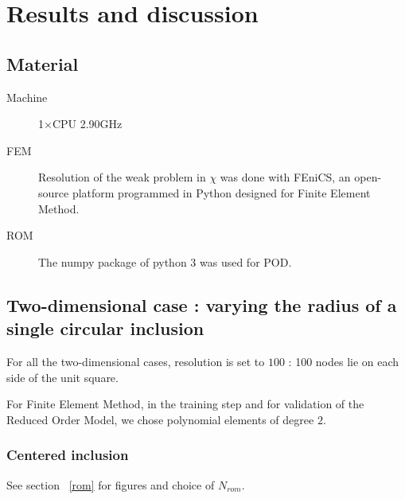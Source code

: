 \section{Results and discussion}\label{res}

\subsection{Material}

\begin{description}
\item [Machine] 1$\times$CPU 2.90GHz
\item [FEM] Resolution of the weak problem in $\chi$ was done with FEniCS, %
an open-source platform programmed in Python designed for Finite Element Method.
\item [ROM] The numpy package of python 3 was used for POD.
\end{description}

\subsection{Two-dimensional case : varying the radius of a single circular inclusion}

For all the two-dimensional cases, resolution is set to $100$ : %
100 nodes lie on each side of the unit square.

\par
For Finite Element Method, in the training step and for validation of the Reduced Order Model, we chose polynomial elements of degree $2$.

\subsubsection{Centered inclusion}

See section \ \ref{rom} for figures and choice of $N_{rom}$.
\begin{comment}
\begin{figure}[H]%
%
\begin{center}
\begin{tabular}{|c|c||c|c||c|c||c|c||c||c|}
\hline
$\rho^{new}$&Porosity&${D_k^{hom,ROM}}_{11}$&${D_k^{hom,FEM}}_{11}$&$Err$&$\phi_i^{new}$&ROM&FEM&Nodes\\
\hline
0,22&0,8479&0,73607&0,73606&0,001\%&14.9s&0.8s&22.5s&202432\\
\hline
0,33&0,6579&0,4880&0,1887&0,006\%&11.8s&0.8s&13.3s&157456\\
\hline
0,44&0,3918&0,2238&0,2235&0,114\%&8.5s&0.7s&4.8s&92866\\
\hline
\end{tabular}
\end{center}
\caption{$N_{rom}=5$}
%
\end{figure}

\end{comment}

